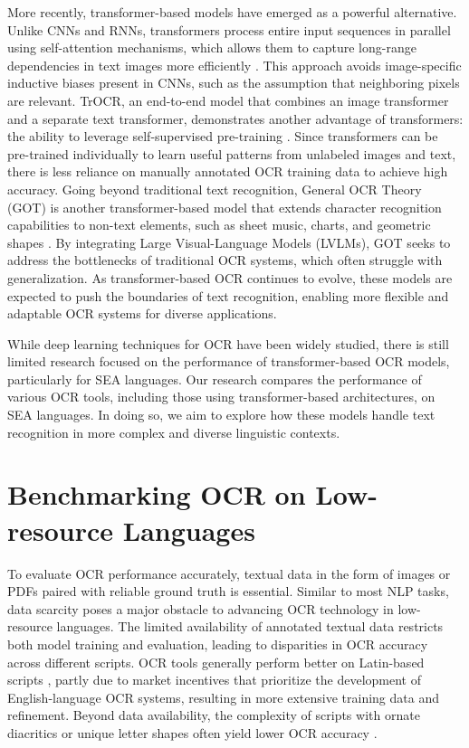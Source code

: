 \documentclass[12pt,oneside]{memoir}
\begin{document}
More recently, transformer-based models have emerged as a powerful alternative.
Unlike CNNs and RNNs, transformers process entire input sequences in parallel using self-attention mechanisms, which allows them to capture long-range dependencies in text images more efficiently \parencite{vaswani-2017}.
This approach avoids image-specific inductive biases present in CNNs, such as the assumption that neighboring pixels are relevant.
TrOCR, an end-to-end model that combines an image transformer and a separate text transformer, demonstrates another advantage of transformers: the ability to leverage self-supervised pre-training \parencite{li-etal-2021}. 
Since transformers can be pre-trained individually to learn useful patterns from unlabeled images and text, there is less reliance on manually annotated OCR training data to achieve high accuracy.
Going beyond traditional text recognition, General OCR Theory (GOT) is another transformer-based model that extends character recognition capabilities to non-text elements, such as sheet music, charts, and geometric shapes \parencite{wei-etal-2024}.
By integrating Large Visual-Language Models (LVLMs), GOT seeks to address the bottlenecks of traditional OCR systems, which often struggle with generalization.
As transformer-based OCR continues to evolve, these models are expected to push the boundaries of text recognition, enabling more flexible and adaptable OCR systems for diverse applications.

While deep learning techniques for OCR have been widely studied, there is still limited research focused on the performance of transformer-based OCR models, particularly for SEA languages.
Our research compares the performance of various OCR tools, including those using transformer-based architectures, on SEA languages. 
In doing so, we aim to explore how these models handle text recognition in more complex and diverse linguistic contexts.

\section{Benchmarking OCR on Low-resource Languages}

To evaluate OCR performance accurately, textual data in the form of images or PDFs paired with reliable ground truth is essential. 
Similar to most NLP tasks, data scarcity poses a major obstacle to advancing OCR technology in low-resource languages. The limited availability of annotated textual data restricts both model training and evaluation, leading to disparities in OCR accuracy across different scripts.
OCR tools generally perform better on Latin-based scripts \parencite{hegghammer-2022}, partly due to market incentives that prioritize the development of English-language OCR systems, resulting in more extensive training data and refinement.
Beyond data availability, the complexity of scripts with ornate diacritics or unique letter shapes often yield lower OCR accuracy \parencite{agarwal-and-anastasopoulos-2024}.
\end{document}
